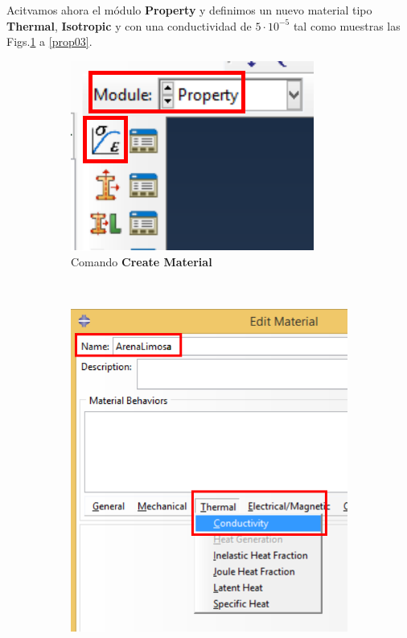   Acitvamos ahora el módulo \textbf{Property} y definimos un nuevo
  material tipo \textbf{Thermal}, \textbf{Isotropic} y con una
  conductividad de $5\cdot 10^{-5}$ tal como muestras las
  Figs.\ref{prop01} a \ref{prop03}.
  \begin{figure}
    \centering
    \begin{subfigure}[!h]{0.22\textwidth}
      \includegraphics[width=\textwidth]{./body/images/prop01.pdf}
      \caption{Comando \textbf{Create Material}}
      \label{prop01}
    \end{subfigure}%
    ~ %
    \begin{subfigure}[!h]{0.36\textwidth}
      \includegraphics[width=\textwidth]{./body/images/prop02.pdf}

\end{subfigure}
\end{figure}
